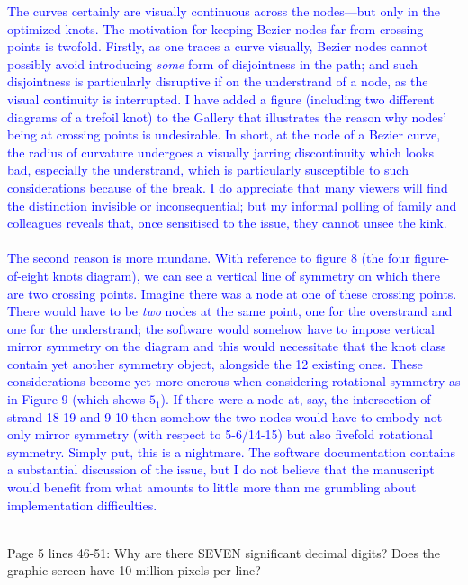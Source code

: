 \documentclass[12pt]{article}
\begin{document}
\textcolor{blue}{The curves certainly are visually continuous across
  the nodes---but only in the optimized knots.  The motivation for
  keeping Bezier nodes far from crossing points is twofold.  Firstly,
  as one traces a curve visually, Bezier nodes cannot possibly avoid
  introducing {\em some} form of disjointness in the path; and such
  disjointness is particularly disruptive if on the understrand of a
  node, as the visual continuity is interrupted.  I have added a
  figure (including two different diagrams of a trefoil knot) to the
  Gallery that illustrates the reason why nodes' being at crossing
  points is undesirable.  In short, at the node of a Bezier curve, the
  radius of curvature undergoes a visually jarring discontinuity which
  looks bad, especially the understrand, which is particularly
  susceptible to such considerations because of the break.  I do
  appreciate that many viewers will find the distinction invisible or
  inconsequential; but my informal polling of family and colleagues
  reveals that, once sensitised to the issue, they cannot unsee the
  kink.  \\ \\ The second reason is more mundane.  With reference to
  figure 8 (the four figure-of-eight knots diagram), we can see a
  vertical line of symmetry on which there are two crossing points.
  Imagine there was a node at one of these crossing points.  There
  would have to be {\em two} nodes at the same point, one for the
  overstrand and one for the understrand; the software would somehow
  have to impose vertical mirror symmetry on the diagram and this
  would necessitate that the knot class contain yet another symmetry
  object, alongside the 12 existing ones.  These considerations become
  yet more onerous when considering rotational symmetry as in Figure 9
  (which shows $5_1$).  If there were a node at, say, the intersection
  of strand 18-19 and 9-10 then somehow the two nodes would have to
  embody not only mirror symmetry (with respect to 5-6/14-15) but also
  fivefold rotational symmetry.  Simply put, this is a nightmare.  The
  software documentation contains a substantial discussion of the
  issue, but I do not believe that the manuscript would benefit from
  what amounts to little more than me grumbling about implementation
  difficulties.\\ \\}

Page 5 lines 46-51: Why are there SEVEN significant decimal digits?
Does the graphic screen have 10 million pixels per line?
\end{document}
